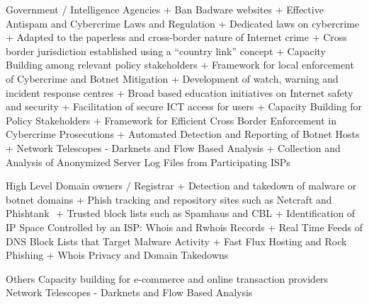 
    Government / Intelligence Agencies
    + Ban Badware websites
    + Effective Antispam and Cybercrime Laws and Regulation
    + Dedicated laws on cybercrime
    + Adapted to the paperless and cross-border nature of Internet crime
    + Cross border jurisdiction established using a “country link” concept 
    + Capacity Building among relevant policy stakeholders 
    + Framework for local enforcement of Cybercrime and Botnet Mitigation 
    + Development of watch, warning and incident response centres
    + Broad based education initiatives on Internet safety and security 
    + Facilitation of secure ICT access for users 
    + Capacity Building for Policy Stakeholders 
    + Framework for Efficient Cross Border Enforcement in Cybercrime Prosecutions
    + Automated Detection and Reporting of Botnet Hosts 
    + Network Telescopes - Darknets and Flow Based Analysis 
    + Collection and Analysis of Anonymized Server Log Files from Participating ISPs 
    
    High Level Domain owners / Registrar
    + Detection and takedown of malware or botnet domains
    + Phish tracking and repository sites such as Netcraft and Phishtank
   + Trusted block lists such as Spamhaus and CBL 
    + Identification of IP Space Controlled by an ISP: Whois and Rwhois Records 
    + Real Time Feeds of DNS Block Lists that Target Malware Activity 
    + Fast Flux Hosting and Rock Phishing
    + Whois Privacy and Domain Takedowns 
    
    Others
    Capacity building for e-commerce and online transaction providers 
    Network Telescopes - Darknets and Flow Based Analysis 
